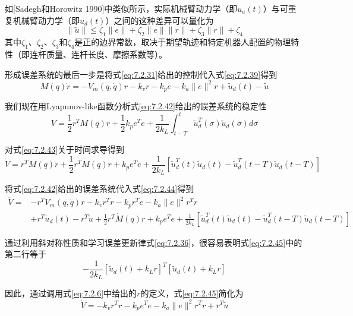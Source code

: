 \documentclass[UTF8]{ctexart}
\begin{document}
如[Sadegh和Horowitz 1990]中类似所示，实际机械臂动力学（即$u_a(t)$）与可重复机械臂动力学（即$u_d(t)$）之间的这种差异可以量化为
\begin{equation}\label{eq:7.2.41}
\|\tilde{u}\| \leq \zeta_1\|e\| + \zeta_2\|e\|\|r\| + \zeta_3\|r\| + \zeta_4
\end{equation}
其中$\zeta_1$、$\zeta_2$、$\zeta_3$和$\zeta_4$是正的边界常数，取决于期望轨迹和特定机器人配置的物理特性（即连杆质量、连杆长度、摩擦系数等）。

形成误差系统的最后一步是将式\eqref{eq:7.2.31}给出的控制代入式\eqref{eq:7.2.39}得到
\begin{equation}\label{eq:7.2.42}
M(q)\dot{r} = -V_m(q,\dot{q})r - k_v r - k_p e - k_a\|e\|^2r + \tilde{u}_d(t) - \tilde{u}
\end{equation}

我们现在用Lyapunov-like函数分析式\eqref{eq:7.2.42}给出的误差系统的稳定性
\begin{equation}\label{eq:7.2.43}
V = \frac{1}{2}r^T M(q)r + \frac{1}{2}k_p e^T e + \frac{1}{2k_L}\int_{t-T}^{t}\tilde{u}_d^T(\sigma)\tilde{u}_d(\sigma)d\sigma
\end{equation}

对式\eqref{eq:7.2.43}关于时间求导得到
\begin{equation}\label{eq:7.2.44}
\dot{V} = r^T M(q)\dot{r} + \frac{1}{2}r^T\dot{M}(q)r + k_p e^T\dot{e} + \frac{1}{2k_L}[\tilde{u}_d^T(t)\tilde{u}_d(t) - \tilde{u}_d^T(t-T)\tilde{u}_d(t-T)]
\end{equation}

将式\eqref{eq:7.2.42}给出的误差系统代入式\eqref{eq:7.2.44}得到
\begin{equation}\label{eq:7.2.45}
\begin{aligned}
\dot{V} = & -r^T V_m(q,\dot{q})r - k_v r^T r - k_p r^T e - k_a\|e\|^2r^T r \\
& + r^T\tilde{u}_d(t) - r^T\tilde{u} + \frac{1}{2}r^T\dot{M}(q)r + k_p e^T\dot{e} + \frac{1}{2k_L}[\tilde{u}_d^T(t)\tilde{u}_d(t) - \tilde{u}_d^T(t-T)\tilde{u}_d(t-T)]
\end{aligned}
\end{equation}

通过利用斜对称性质和学习误差更新律式\eqref{eq:7.2.36}，很容易表明式\eqref{eq:7.2.45}中的第二行等于
\begin{equation*}
-\frac{1}{2k_L}[\tilde{u}_d(t) + k_L r]^T[\tilde{u}_d(t) + k_L r]
\end{equation*}

因此，通过调用式\eqref{eq:7.2.6}中给出的$r$的定义，式\eqref{eq:7.2.45}简化为
\begin{equation}\label{eq:7.2.46}
\dot{V} = -k_v r^T r - k_p e^T e - k_a\|e\|^2r^T r + r^T\tilde{u}
\end{equation}
\end{document}
